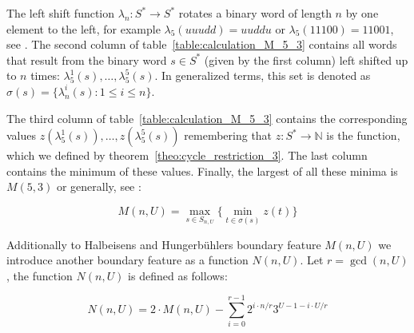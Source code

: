 \documentclass[12pt]{amsart}
\theoremstyle{definition}
\begin{document}
The left shift function $\lambda_n:S^\ast\rightarrow S^\ast$ rotates a binary word of length $n$ by one element to the left, for example $\lambda_5(uuudd)=uuddu$ or $\lambda_5(11100)=11001$, see \cite{Ref_Halbeisen_Hungerbuehler_1997}. The second column of table~\ref{table:calculation_M_5_3} contains all words that result from the binary word $s\in S^\ast$ (given by the first column) left shifted up to $n$ times: $\lambda_5^1(s),\ldots,\lambda_5^5(s)$. In generalized terms, this set is denoted as $\sigma(s)=\{\lambda_n^i(s):1\le i\le n\}$.

The third column of table~\ref{table:calculation_M_5_3} contains the corresponding values $z(\lambda_5^1(s)),\ldots,z(\lambda_5^5(s))$ remembering that $z:S^\ast\rightarrow\mathbb{N}$ is the function, which we defined by theorem~\ref{theo:cycle_restriction_3}. The last column contains the minimum of these values. Finally, the largest of all these minima is $M(5,3)$ or generally, see \cite{Ref_Halbeisen_Hungerbuehler_1997}:

\begin{equation}
\label{eq:M_n_U}
M(n,U)=\max_{s\in S_{n,U}}\{\min_{t\in\sigma(s)}z(t)\}
\end{equation}

Additionally to Halbeisens and Hungerbühlers boundary feature $M(n,U)$ we introduce another boundary feature as a function $N(n,U)$. Let $r=\gcd(n, U)$, the function $N(n,U)$ is defined as follows:

\begin{equation}
\label{eq:N_n_U}
N(n,U)=2\cdot M(n,U)-\sum_{i=0}^{r-1}2^{i\cdot n/r}3^{U-1-i\cdot U/r}
\end{equation}
\end{document}

